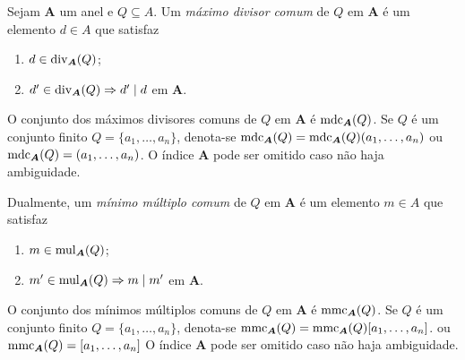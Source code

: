 


\begin{defi}
	Sejam $\bm A$ um anel e $Q \subseteq A$. Um \emph{máximo divisor comum} de $Q$ em $\bm A$ é um elemento $d \in A$ que satisfaz
	\begin{enumerate}
	\item $d \in \operatorname{div}_{\bm A}(Q)$;
	\item $d' \in \operatorname{div}_{\bm A}(Q) \Rightarrow d' \mid d$ em $\bm A$.
	\end{enumerate}
	O conjunto dos máximos divisores comuns de $Q$ em $\bm A$ é $\operatorname{mdc}_{\bm A}(Q)$. Se $Q$ é um conjunto finito $Q=\{a_1,\ldots,a_n\}$, denota-se $\operatorname{mdc}_{\bm A}(Q)=\operatorname{mdc}_{\bm A}(Q)(a_1,\ldots,a_n)$ ou $\operatorname{mdc}_{\bm A}(Q)=(a_1,\ldots,a_n)$. O índice $\bm A$ pode ser omitido caso não haja ambiguidade.

	Dualmente, um \emph{mínimo múltiplo comum} de $Q$ em $\bm A$ é um elemento $m \in A$ que satisfaz
	\begin{enumerate}
	\item $m \in \operatorname{mul}_{\bm A}(Q)$;
	\item $m' \in \operatorname{mul}_{\bm A}(Q) \Rightarrow m \mid m'$ em $\bm A$.
	\end{enumerate}
	O conjunto dos mínimos múltiplos comuns de $Q$ em $\bm A$ é $\operatorname{mmc}_{\bm A}(Q)$. Se $Q$ é um conjunto finito $Q=\{a_1, \ldots, a_n\}$, denota-se $\operatorname{mmc}_{\bm A}(Q) = \operatorname{mmc}_{\bm A}(Q)[a_1, \ldots, a_n]$. ou $\operatorname{mmc}_{\bm A}(Q) = [a_1, \ldots, a_n]$ O índice $\bm A$ pode ser omitido caso não haja ambiguidade.
\end{defi}

